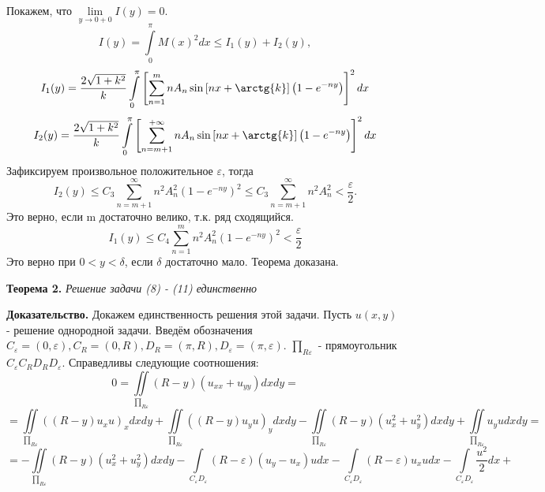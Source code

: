 \documentclass[9pt]{article}
\begin{document}
	Покажем, что $\lim\limits_{y \to 0 + 0} I(y) = 0$.
	\begin{equation*}
		I(y)  = \int\limits_0^\pi M(x)^2 dx \leq I_1(y) + I_2(y),
	\end{equation*}
	\begin{equation*}
		I_1(y) = \dfrac{2\sqrt{1 + k^2}}{k} \int\limits_0^\pi\left[\sum\limits_{n=1}^{m} n A_n \sin{\left[nx + \arctg{k}\right]} \left(1 - e^{-ny}\right)\right]^2 dx
	\end{equation*}
	\begin{equation*}
		I_2(y) = \dfrac{2\sqrt{1 + k^2}}{k} \int\limits_0^\pi\left[\sum\limits_{n=m+1}^{+\infty} n A_n \sin{\left[nx + \arctg{k}\right]} \left(1 - e^{-ny}\right)\right]^2 dx
	\end{equation*}
	Зафиксируем произвольное положительное $\varepsilon$, тогда
	\begin{equation*}
		I_2(y) \leq C_3 \sum\limits_{n=m+1}^{\infty} n^2 A_n^2 (1 - e^{-ny})^2 \leq C_3 \sum\limits_{n=m+1}^{\infty} n^2 A_n^2 < \dfrac{\varepsilon}{2}.
	\end{equation*}
	Это верно, если m достаточно велико, т.к. ряд сходящийся.
	\begin{equation*}
		I_1(y) \leq C_4 \sum\limits_{n=1}^{m} n^2 A_n^2 (1 - e^{-ny})^2 < \dfrac{\varepsilon}{2}
	\end{equation*}
	Это верно при $0 < y < \delta$, если $\delta$ достаточно мало. Теорема доказана.
	\par
	\textbf{Теорема 2.} \textit{Решение задачи (8) - (11) единственно}
	\par
	\textbf{Доказательство.} Докажем единственность решения этой задачи. Пусть $u(x,y)$ - решение однородной задачи.
	Введём обозначения $C_\varepsilon = (0, \varepsilon), C_R = (0, R), D_R = (\pi, R), D_\varepsilon = (\pi, \varepsilon)$. $\prod_{R\varepsilon}$ - прямоугольник $C_\varepsilon C_R D_R D_\varepsilon$. Справедливы следующие соотношения:
	\begin{equation*}
		0 = \iint\limits_{\prod_{R\varepsilon}} (R-y) (u_{xx} + u_{yy}) dx dy = 
	\end{equation*}
	\begin{equation*}
		=	\iint\limits_{\prod_{R\varepsilon}} \left( \left(R - y\right) u_x u\right)_x dx dy  + \iint\limits_{\prod_{R\varepsilon}} \left( \left(R - y\right) u_y u\right)_y dx dy  
		- \iint\limits_{\prod_{R\varepsilon}} \left(R- y\right) \left(u_x^2 + u_y^2\right)dxdy + \iint\limits_{\prod_{R\varepsilon}} u_y u dx dy = 
	\end{equation*}
	\begin{equation*}
		= - \iint\limits_{\prod_{R\varepsilon}} \left(R - y\right) \left(u_x^2 + u_y^2\right) dx dy - 
		\int\limits_{C_\varepsilon D_\varepsilon} \left(R - \varepsilon \right) \left(u_y - u_x\right)u dx - \int\limits_{C_\varepsilon D_\varepsilon} \left(R - \varepsilon\right) u_x u dx - \int\limits_{C_\varepsilon D_\varepsilon}\dfrac{u^2}{2} dx +
	\end{equation*}
\end{document}
